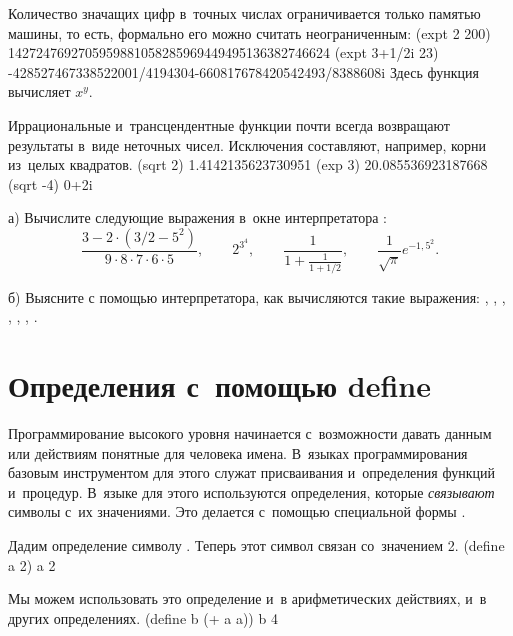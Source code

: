 Количество значащих цифр в~точных числах ограничивается только памятью машины, то есть, формально его можно считать неограниченным:
\REPL
  {(expt 2 200)}
  {1427247692705959881058285969449495136382746624}
\REPL
  {(expt 3+1/2i 23)}
  {-428527467338522001/4194304-660817678420542493/8388608i}
Здесь функция  вычисляет $x^y$.

\begin{example}{%
Иррациональные и~трансцендентные функции почти всегда возвращают результаты в~виде неточных чисел. Исключения составляют, например, корни из~целых квадратов.}
\REPL
  {(sqrt 2)}
  {1.4142135623730951}
\REPL
  {(exp 3)}
  {20.085536923187668}
\REPL
  {(sqrt -4)}
  {0+2i}
\end{example}

\begin{Assignment}
а) Вычислите следующие выражения в~окне интерпретатора \DrRacket:
$$
\frac{3- 2\cdot(3/2-5^2)}{9\cdot 8\cdot 7\cdot 6\cdot 5},\qquad
2^{3^4},\qquad
\frac{1}{1+\frac{1}{1+1/2}},\qquad
\frac{1}{\sqrt{\pi}}e^{-1,5^2}.
$$

б) Выясните с помощью интерпретатора, как вычисляются такие выражения: \s{+}, , \s{(+)}, , \s{(-)}, , \s{(/)}.
\end{Assignment}



\section{Определения с~помощью define}%
\label{define}Программирование высокого уровня начинается с~возможности давать данным или действиям понятные для человека имена. В~языках программирования базовым инструментом для этого служат присваивания и~определения функций и~процедур. В~языке \Scheme для этого
используются определения, которые \emph{связывают} символы с~их значениями. Это делается с~помощью специальной формы .

\begin{example}{%
Дадим определение символу . Теперь этот символ связан со~значением 2.}
\REPLin
  {(define a 2)}
\REPL
  {a}
  {2}
\end{example}


\begin{example}{%
Мы можем использовать это определение и~в арифметических действиях, и~в других определениях.}
\REPLin
  {(define b (+ a a))}
\REPL
  {b}
  {4}
\end{example}

